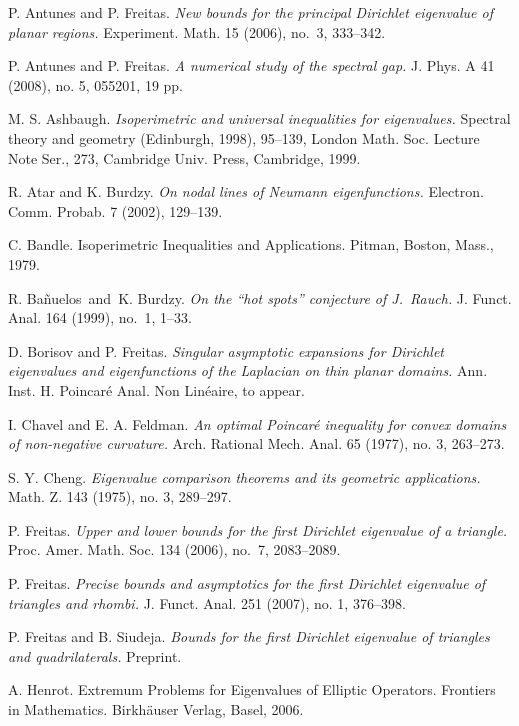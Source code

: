 \documentclass[11pt,reqno]{amsart}
\numberwithin{equation}{section}
\begin{document}
\begin{thebibliography}{99}
 P. Antunes and P. Freitas. {\it New bounds for the principal
Dirichlet eigenvalue of planar regions.} Experiment. Math. 15
(2006), no.~3, 333--342.

 P. Antunes and P. Freitas. {\it A numerical study of the spectral gap.}
J. Phys. A  41 (2008), no. 5, 055201, 19 pp.

M. S. Ashbaugh. {\it Isoperimetric and universal inequalities for
eigenvalues.} Spectral theory and geometry (Edinburgh, 1998),
95--139, London Math. Soc. Lecture Note Ser., 273, Cambridge Univ.
Press, Cambridge, 1999.

 R. Atar and K. Burdzy. {\it On nodal lines of Neumann
eigenfunctions.} Electron. Comm. Probab. 7 (2002), 129--139.

 C. Bandle. Isoperimetric Inequalities and
Applications. Pitman, Boston, Mass., 1979.

 R. Ba\~nuelos\ and\ K. Burdzy. {\it On the ``hot spots'' conjecture of J.\ Rauch.} J. Funct. Anal. 164 (1999), no.~1, 1--33.

D. Borisov and P. Freitas. {\it Singular asymptotic expansions for
Dirichlet eigenvalues and eigenfunctions of the Laplacian on thin
planar domains.} Ann. Inst. H. Poincar\'{e} Anal. Non Lin\'{e}aire,
to appear.

I. Chavel and E. A. Feldman. {\it An optimal Poincar\'{e} inequality for convex domains of non-negative curvature.} Arch. Rational Mech. Anal. 65 (1977), no. 3, 263--273.

 S. Y. Cheng. {\it Eigenvalue comparison theorems
and its geometric applications.} Math. Z. 143 (1975), no. 3,
289--297.

 P. Freitas. {\it Upper and lower bounds for the first Dirichlet
eigenvalue of a  triangle.} Proc. Amer. Math. Soc. 134 (2006),
no.~7, 2083--2089.

P. Freitas. {\it Precise bounds and asymptotics for the first
Dirichlet eigenvalue of triangles and rhombi.} J. Funct. Anal. 251
(2007), no. 1, 376--398.

 P. Freitas and B. Siudeja. {\it Bounds for the first Dirichlet
eigenvalue of triangles and quadrilaterals.} Preprint.

 A. Henrot. Extremum Problems for Eigenvalues of Elliptic Operators.
Frontiers in Mathematics. Birkh\"{a}user Verlag, Basel, 2006.


\end{thebibliography}
\end{document}
